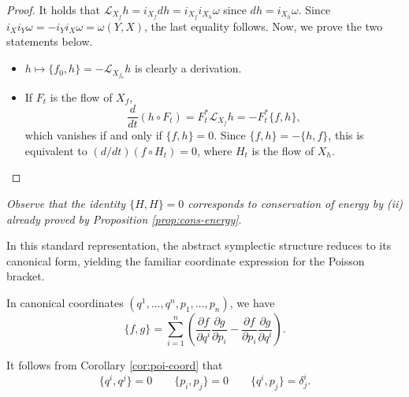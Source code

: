 \begin{proof}
It holds that $\mathcal{L}_{X_f}h = i_{X_f} d h = i_{X_f} i_{X_h} \omega$ since $dh = i_{X_h} \omega$. Since $i_X i_Y \omega = - i_Y i_X \omega = \omega(Y, X)$, the last equality follows. Now, we prove the two statements below.
\begin{itemize}
	\item[(i)] $h \mapsto \{f_0, h\} = -\mathcal{L}_{X_{f_0}} h$ is clearly a derivation. 
	\item[(ii)] If $F_t$ is the flow of $X_f$,
	\[
	\frac{d}{dt} (h \circ F_t) = F_t^* \mathcal{L}_{X_f}h = -F_t^* \{f, h\},
	\]
	which vanishes if and only if $\{f, h\} = 0$. Since $\{f, h\} = -\{h, f\}$, this is equivalent to $(d/dt)(f \circ H_t) = 0$, where $H_t$ is the flow of $X_h$.
\end{itemize}
\end{proof}
\noindent \textit{Observe that the identity $\{H, H\} = 0$ corresponds to conservation of energy by (ii) already proved by Proposition \ref{prop:cons-energy}}.

\medskip  In this standard representation, the abstract symplectic structure reduces to its canonical form, yielding the familiar coordinate expression for the Poisson bracket.

\begin{corollary}\label{cor:poi-coord}
	In canonical coordinates  $(q^1, \dots, q^n, p_1, \dots, p_n)$, we have
	\[
	\{f, g\} = \sum_{i=1}^n \left( \frac{\partial f}{\partial q^i} \frac{\partial g}{\partial p_i} - \frac{\partial f}{\partial p_i} \frac{\partial g}{\partial q^i} \right).
	\]
\end{corollary}

\begin{remark}
	It follows from Corollary \ref{cor:poi-coord} that $$\{q^i, q^j\} = 0 \qquad \{p_i, p_j\} = 0 \qquad \{q^i, p_j\} = \delta^i_j.$$
\end{remark}



